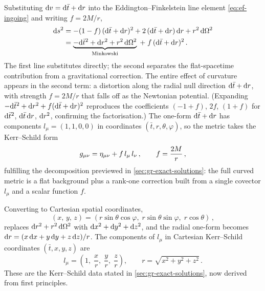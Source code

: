Substituting $\mathrm{d} v = \mathrm{d}\bar{t} + \mathrm{d} r$ into the Eddington--Finkelstein line
element \eqref{eq:ef-ingoing} and writing $f = 2M/r$,
%
\begin{align}
  \mathrm{d} s^2 &= -(1 - f)\,(\mathrm{d}\bar{t} + \mathrm{d} r)^2
    + 2\,(\mathrm{d}\bar{t} + \mathrm{d} r)\,\mathrm{d} r
    + r^2\,\mathrm{d}\Omega^2 \notag \\
  &= \underbrace{-\mathrm{d}\bar{t}^2 + \mathrm{d} r^2
    + r^2\,\mathrm{d}\Omega^2}_{\text{Minkowski}}
    \;+\; f\,(\mathrm{d}\bar{t} + \mathrm{d} r)^2 \,.
  \label{eq:ks-spherical}
\end{align}
%
The first line substitutes directly; the second separates the
flat-spacetime contribution from a gravitational correction.  The entire
effect of curvature appears in the second term: a distortion along the
radial null direction $\mathrm{d}\bar{t} + \mathrm{d} r$, with strength $f = 2M/r$ that
falls off as the Newtonian potential.  (Expanding
$-\mathrm{d}\bar{t}^2 + \mathrm{d} r^2 + f(\mathrm{d}\bar{t} + \mathrm{d} r)^2$ reproduces the
coefficients $(-1+f)$, $2f$, $(1+f)$ for
$\mathrm{d}\bar{t}^2$, $\mathrm{d}\bar{t}\,\mathrm{d} r$, $\mathrm{d} r^2$, confirming the
factorisation.)  The one-form $\mathrm{d}\bar{t} + \mathrm{d} r$ has components
$l_\mu = (1, 1, 0, 0)$ in coordinates $(\bar{t}, r, \theta, \varphi)$,
so the metric takes the Kerr--Schild form
%
\begin{equation}
  g_{\mu\nu} = \eta_{\mu\nu} + f\,l_\mu\,l_\nu \,,
  \qquad f = \frac{2M}{r} \,,
  \label{eq:ks-schw-metric}
\end{equation}
%
fulfilling the decomposition previewed in \cref{sec:gr-exact-solutions}:
the full curved metric is a flat background plus a rank-one correction
built from a single covector $l_\mu$ and a scalar function $f$.

Converting to Cartesian spatial coordinates,
%
\[
  (x,\, y,\, z)
    = (r\sin\theta\cos\varphi,\;
       r\sin\theta\sin\varphi,\;
       r\cos\theta) \,,
\]
%
replaces $\mathrm{d} r^2 + r^2\,\mathrm{d}\Omega^2$ with
$\mathrm{d} x^2 + \mathrm{d} y^2 + \mathrm{d} z^2$, and the radial one-form becomes
$\mathrm{d} r = (x\,\mathrm{d} x + y\,\mathrm{d} y + z\,\mathrm{d} z)/r$.  The components of $l_\mu$ in
Cartesian Kerr--Schild coordinates $(\bar{t}, x, y, z)$ are
%
\begin{equation}
  l_\mu = \left(1,\; \frac{x}{r},\; \frac{y}{r},\;
    \frac{z}{r}\right) , \qquad r = \sqrt{x^2 + y^2 + z^2} \,.
  \label{eq:ks-null-oneform}
\end{equation}
%
These are the Kerr--Schild data stated in \cref{sec:gr-exact-solutions},
now derived from first principles.

